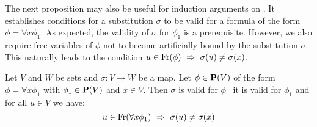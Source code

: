 The next proposition may also be useful for induction arguments on
\pv. It establishes conditions for a substitution $\sigma$ to be
valid for a formula of the form $\phi=\forall x\phi_{1}$. As
expected, the validity of $\sigma$ for $\phi_{1}$ is a prerequisite.
However, we also require free variables of $\phi$ not to become
artificially bound by the substitution $\sigma$. This naturally
leads to the condition $u\in\mbox{\rm Fr}(\phi)\ \Rightarrow\
\sigma(u)\neq\sigma(x)$.

\begin{prop}\label{logic:prop:FOPL:valid:recursion:quant}
Let $V$ and $W$ be sets and $\sigma:V\to W$ be a map. Let
$\phi\in\mbox{${\bf P}(V)$}$ of the form $\phi=\forall x\phi_{1}$ with
$\phi_{1}\in\mbox{${\bf P}(V)$}$ and $x\in V$. Then $\sigma$ is valid for $\phi$
\ifand\ it is valid for $\phi_{1}$ and for all $u\in V$ we have:
    \[
    u\in\free(\forall x\phi_{1})\ \Rightarrow\
    \sigma(u)\neq\sigma(x)
    \]
\end{prop}
